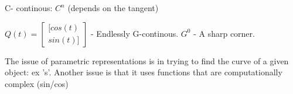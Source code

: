 \begin{definition}[C - continous]
C- continous: $C^n$ (depends on the tangent)
\end{definition}

\begin{example}[continous]
$Q(t) = \begin{bmatrix} [cos(t) \\ sin(t) ] \end{bmatrix}$ - Endlessly G-continous.
$G^0$ - A sharp corner. 

\end{example}

\begin{remark}
The issue of parametric representations is in trying to find the curve of a given object: ex 's'.
Another issue is that it uses functions that are computationally complex (sin/cos)
\end{remark}
